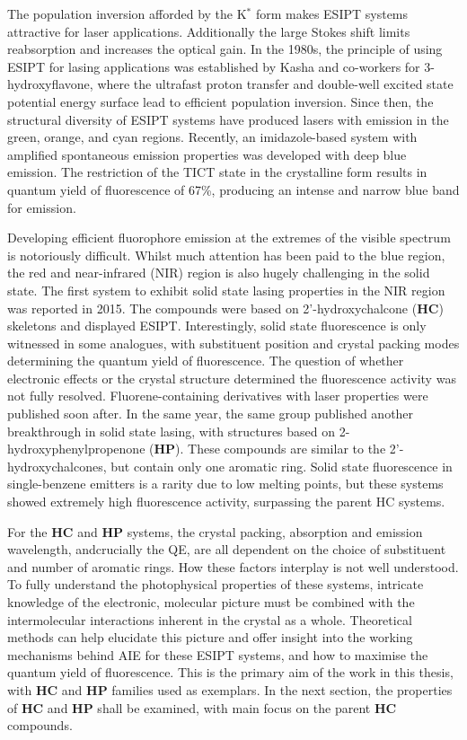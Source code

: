 The population inversion afforded by the K$^\ast$ form makes ESIPT systems attractive for laser applications.\cite{Fang2014,Gierschner2016} Additionally the large Stokes shift limits reabsorption and increases the optical gain.\cite{Kwon2011} In the 1980s, the principle of using ESIPT for lasing applications was established by Kasha and co-workers for 3-hydroxyflavone, where the ultrafast proton transfer and double-well excited state potential energy surface lead to efficient population inversion.\cite{Khan1983,Chou1984} Since then, the structural diversity of ESIPT systems have produced lasers with emission in the green, orange, and cyan regions.\cite{Sakai2016,Chen2016,Park2012,Park2008} Recently, an imidazole-based system with amplified spontaneous emission properties was developed with deep blue emission.\cite{Park2017} The restriction of the TICT state in the crystalline form results in quantum yield of fluorescence of 67\%, producing an intense and narrow blue band for emission. 

Developing efficient fluorophore emission at the extremes of the visible spectrum is notoriously difficult. Whilst much attention has been paid to the blue region, the red and near-infrared (NIR) region is also hugely challenging in the solid state. The first system to exhibit solid state lasing properties in the NIR region was reported in 2015.\cite{Cheng2015} The compounds were based on 2'-hydroxychalcone (\textbf{HC}) skeletons and displayed ESIPT. Interestingly, solid state fluorescence is only witnessed in some analogues, with substituent position and crystal packing modes determining the quantum yield of fluorescence. The question of whether electronic effects or the crystal structure determined the fluorescence activity was not fully resolved. Fluorene-containing derivatives with laser properties were published soon after.\cite{Cheng2016} In the same year, the same group published another breakthrough in solid state lasing, with structures based on 2-hydroxyphenylpropenone (\textbf{HP}).\cite{Tang2016} These compounds are similar to the 2'-hydroxychalcones, but contain only one aromatic ring. Solid state fluorescence in single-benzene emitters is a rarity due to low melting points, but these systems showed extremely high fluorescence activity, surpassing the parent HC systems.

For the \textbf{HC} and \textbf{HP} systems, the crystal packing, absorption and emission wavelength, andcrucially the QE, are all dependent on the choice of substituent and number of aromatic rings. How these factors interplay is not well understood. To fully understand the photophysical properties of these systems, intricate knowledge of the electronic, molecular picture must be combined with the intermolecular interactions inherent in the crystal as a whole. Theoretical methods can help elucidate this picture and offer insight into the working mechanisms behind AIE for these ESIPT systems, and how to maximise the quantum yield of fluorescence. This is the primary aim of the work in this thesis, with \textbf{HC} and \textbf{HP} families used as exemplars. In the next section, the properties of \textbf{HC} and \textbf{HP} shall be examined, with main focus on the parent \textbf{HC} compounds. 

